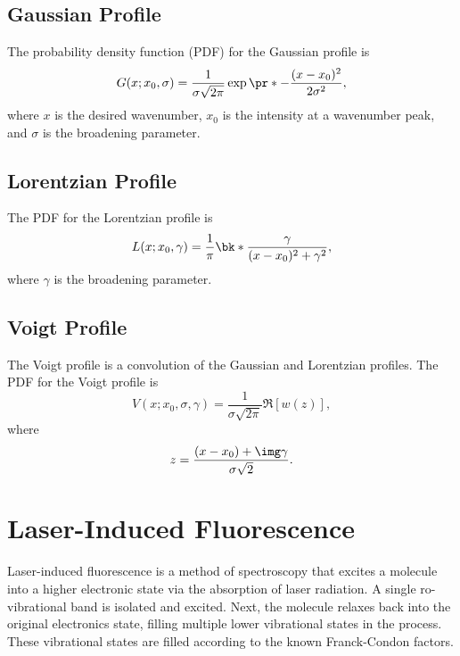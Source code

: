 \documentclass[11pt, twoside, fleqn]{report}
\begin{document}
\section{Gaussian Profile}
\label{s:gaussian_profile}

The probability density function (PDF) for the Gaussian profile is
\begin{equation*}
    G(x; x_0, \sigma) = \frac{1}{\sigma\sqrt{2\pi}}\exp\pr*{-\frac{(x - x_0)^2}{2\sigma^2}},
\end{equation*}
where $x$ is the desired wavenumber, $x_0$ is the intensity at a wavenumber peak, and $\sigma$ is the broadening parameter.

\section{Lorentzian Profile}
\label{s:lorentzian_profile}

The PDF for the Lorentzian profile is
\begin{equation*}
    L(x; x_0, \gamma) = \frac{1}{\pi}\bk*{\frac{\gamma}{(x - x_0)^2 + \gamma^2}},
\end{equation*}
where $\gamma$ is the broadening parameter.

\section{Voigt Profile}
\label{s:voigt_profile}

The Voigt profile is a convolution of the Gaussian and Lorentzian profiles. The PDF for the Voigt profile is
\begin{equation*}
    V(x; x_0, \sigma, \gamma) = \frac{1}{\sigma\sqrt{2\pi}}\Re[w(z)],
\end{equation*}
where
\begin{equation*}
    z = \frac{(x - x_0) + \img\gamma}{\sigma\sqrt{2}}.
\end{equation*}

\chapter{Laser-Induced Fluorescence}
\label{c:laser-induced_flourescence}

Laser-induced fluorescence is a method of spectroscopy that excites a molecule into a higher electronic state via the absorption of laser radiation. A single ro-vibrational band is isolated and excited. Next, the molecule relaxes back into the original electronics state, filling multiple lower vibrational states in the process. These vibrational states are filled according to the known Franck-Condon factors.
\end{document}
